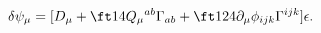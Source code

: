 \begin{equation}
\delta\psi_\mu=[D_\mu+\ft14Q_\mu{}^{ab}\Gamma_{ab}+\ft1{24}\partial_\mu
\phi_{ijk}\Gamma^{ijk}]\epsilon.
\label{eq:dgto}
\end{equation}

